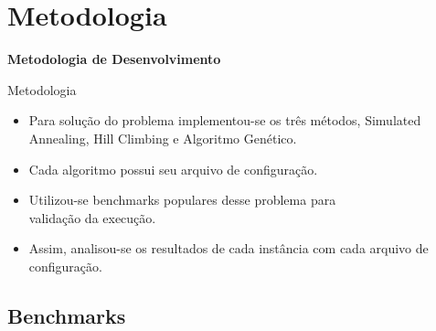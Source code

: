 \section{Metodologia}
	\begin{frame}{}
		\centering
		\Huge \color{blue} \textbf{Metodologia de Desenvolvimento}
	\end{frame}

	\begin{frame}{Metodologia}
		
		\begin{itemize}
			
			\item Para solução do problema implementou-se os três métodos, Simulated Annealing, Hill Climbing e Algoritmo Genético.
			
			\bigskip
			
			\item Cada algoritmo possui seu arquivo de configuração.
			
			\bigskip
			
			\item Utilizou-se benchmarks populares desse problema para \\validação da execução.
            
			\bigskip
			
			\item Assim, analisou-se os resultados de cada instância com cada arquivo de configuração.
			
		\end{itemize}
			
	\end{frame}
		
		\subsection{Benchmarks}
		
